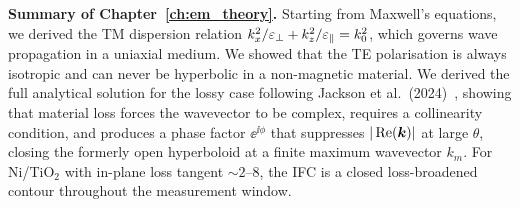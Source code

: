 \begin{resultbox}
\textbf{Summary of Chapter~\ref{ch:em_theory}.} Starting from Maxwell's
equations, we derived the TM dispersion relation
$k_x^2/\varepsilon_{\perp} + k_z^2/\varepsilon_{\parallel} = k_0^2$, which governs wave propagation in a
uniaxial medium. We showed that the TE polarisation is always isotropic and
can never be hyperbolic in a non-magnetic material. We derived the full
analytical solution for the lossy case following Jackson et al.\
(2024)~\cite{jackson2024}, showing that material loss forces the wavevector
to be complex, requires a collinearity condition, and produces a phase factor
$\ee^{\ii\phi}$ that suppresses $|\operatorname{Re}(\bm{k})|$ at large $\theta$, closing
the formerly open hyperboloid at a finite maximum wavevector $k_m$. For
Ni/TiO$_2$ with in-plane loss tangent $\sim 2$--$8$, the IFC is a closed
loss-broadened contour throughout the measurement window.
\end{resultbox}
